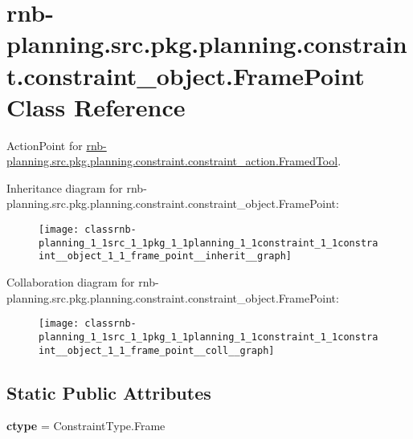 \hypertarget{classrnb-planning_1_1src_1_1pkg_1_1planning_1_1constraint_1_1constraint__object_1_1_frame_point}{}\section{rnb-\/planning.src.\+pkg.\+planning.\+constraint.\+constraint\+\_\+object.\+Frame\+Point Class Reference}
\label{classrnb-planning_1_1src_1_1pkg_1_1planning_1_1constraint_1_1constraint__object_1_1_frame_point}


Action\+Point for \hyperlink{classrnb-planning_1_1src_1_1pkg_1_1planning_1_1constraint_1_1constraint__action_1_1_framed_tool}{rnb-\/planning.\+src.\+pkg.\+planning.\+constraint.\+constraint\+\_\+action.\+Framed\+Tool}.  




Inheritance diagram for rnb-\/planning.src.\+pkg.\+planning.\+constraint.\+constraint\+\_\+object.\+Frame\+Point\+:
\nopagebreak
\begin{figure}[H]
\begin{center}
\leavevmode
\texttt{[image: classrnb-planning\_1\_1src\_1\_1pkg\_1\_1planning\_1\_1constraint\_1\_1constraint\_\_object\_1\_1\_frame\_point\_\_inherit\_\_graph]}
\end{center}
\end{figure}


Collaboration diagram for rnb-\/planning.src.\+pkg.\+planning.\+constraint.\+constraint\+\_\+object.\+Frame\+Point\+:
\nopagebreak
\begin{figure}[H]
\begin{center}
\leavevmode
\texttt{[image: classrnb-planning\_1\_1src\_1\_1pkg\_1\_1planning\_1\_1constraint\_1\_1constraint\_\_object\_1\_1\_frame\_point\_\_coll\_\_graph]}
\end{center}
\end{figure}
\subsection*{Static Public Attributes}
\begin{DoxyCompactItemize}
\item 
\mbox{\label{classrnb-planning_1_1src_1_1pkg_1_1planning_1_1constraint_1_1constraint__object_1_1_frame_point_a948a12d39679aa708a6143b085bddbf0}} 
{\bfseries ctype} = Constraint\+Type.\+Frame
\end{DoxyCompactItemize}
